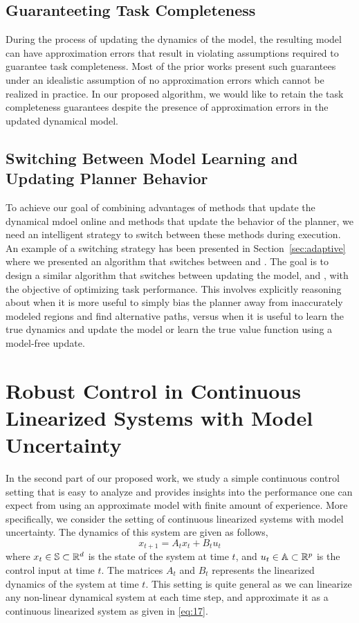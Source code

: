 \subsection{Guaranteeting Task Completeness}
\label{sec:guar-task-compl}

During the process of updating the dynamics of the model, the
resulting model can have approximation errors that result in violating
assumptions required to guarantee task completeness. Most of the prior
works present such guarantees under an idealistic assumption of no
approximation errors which cannot be realized in practice. In our
proposed algorithm, we would like to retain the task completeness
guarantees despite the presence of approximation errors in the updated
dynamical model.

\subsection{Switching Between Model Learning and Updating
  Planner Behavior}
\label{sec:switch-betw-cmax}

To achieve our goal of combining advantages of methods that update the
dynamical mdoel online and methods that update the behavior of the
planner, we need an intelligent strategy to switch between these
methods during execution. An example of a switching strategy has
been presented in Section~\ref{sec:adaptive} where we presented an
algorithm that switches between \cmax{} and \cmaxpp{}. The goal is to
design a similar algorithm that switches between updating the model,
\cmax{} and \cmaxpp{}, with the objective of optimizing task
performance. This involves explicitly reasoning about when it is more
useful to simply bias the planner away from inaccurately modeled
regions and find alternative paths, versus when it is useful to learn
the true dynamics and update the model or learn the true value
function using a model-free update.

\section{Robust Control in Continuous Linearized Systems with Model
  Uncertainty}
\label{sec:robust-contr-cont}

In the second part of our proposed work, we study a simple
continuous control setting that is easy to analyze and provides
insights into the performance one can expect from using an approximate
model with finite amount of experience. More specifically, we
consider the setting of continuous linearized systems with model
uncertainty. The dynamics of this system are given as follows,
\begin{equation}
  \label{eq:17}
  x_{t+1} = A_tx_t + B_tu_t
\end{equation}
where $x_t \in \mathbb{S} \subset \mathbb{R}^d$ is the state of the
system at time $t$, and $u_t \in \mathbb{A} \subset \mathbb{R}^p$ is the
control input at time $t$. The matrices $A_t$ and $B_t$ represents the
linearized 
dynamics of the system at time $t$. This setting is quite general as
we can linearize any non-linear dynamical system at each time step,
and approximate it as a continuous linearized system as given in
\eqref{eq:17}.


